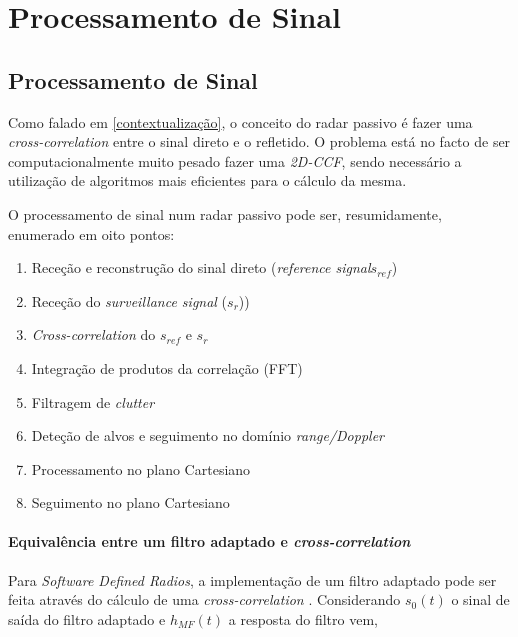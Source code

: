 
\chapter{Processamento de Sinal} %
\label{chap:Chapter4} %


\section{Processamento de Sinal}
Como falado em \ref{contextualização}, o conceito do radar passivo é fazer uma \textit{cross-correlation} entre o sinal direto e o refletido. O problema está no facto de ser computacionalmente muito pesado fazer uma \textit{\gls{2D-CCF}}, sendo necessário a utilização de algoritmos mais eficientes para o cálculo da mesma.\par
O processamento de sinal num radar passivo pode ser, resumidamente, enumerado em oito pontos:
\begin{enumerate}
	\item Receção e reconstrução do sinal direto (\textit{reference signal}$s_{ref}$)
	\item Receção do \textit{surveillance signal} ($s_{r}$))
	\item \textit{Cross-correlation} do $s_{ref}$ e $s_{r}$
	\item Integração de produtos da correlação (FFT)
	\item Filtragem de \textit{clutter}
	\item Deteção de alvos e seguimento no domínio \textit{range/Doppler}
	\item Processamento no plano Cartesiano
	\item Seguimento no plano Cartesiano
\end{enumerate}

\subsubsection*{Equivalência entre um filtro adaptado e \textit{cross-correlation}}

Para \textit{Software Defined Radios}, a implementação de um filtro adaptado pode ser feita através do cálculo de uma \textit{cross-correlation} \parencite{Martorella}. Considerando $s_{0}(t)$ o sinal de saída do filtro adaptado e $h_{MF}(t)$ a resposta do filtro vem, 

